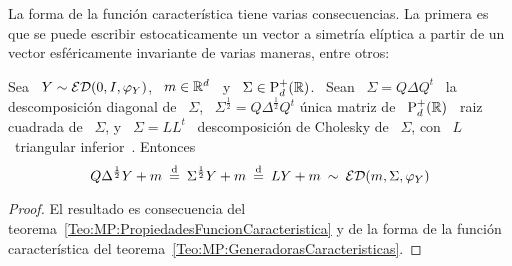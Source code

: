 La forma de la funci\'on caracter\'istica tiene varias consecuencias. La primera
es  que se  puede escribir  estocaticamente un  vector a  simetr\'ia  el\'iptica a
partir de un vector esf\'ericamente invariante de varias maneras, entre otros:
%
\begin{corolario}
  Sea  \ $Y  \sim  \mathcal{ED}(0,I,\varphi_Y)$, \  $m \in  \mathbb{R}^d$  \ y  \ $\Sigma  \in
  \mathrm{P}_d^+(\mathbb{R})$. \ Sean \ $\Sigma = Q \Delta Q^t$ \ la descomposici\'on diagonal
  de \ $\Sigma$, \ $\Sigma^{\frac12} = Q \Delta^{\frac12} Q^t$ \'unica matriz de
  \  $\mathrm{P}_d^+(\mathbb{R})$ \  raiz cuadrada  de \  $\Sigma$,  y \  $\Sigma =  L L^t$  \
  descomposici\'on  de  Cholesky   de  \  $\Sigma$,  con  \   $L$  \  triangular
  inferior~\cite{HorJoh13, Bha07}.  Entonces
  \[
  Q \Delta^{\frac12} Y + m \: \stackrel{\mathrm{d}}{=} \:  \Sigma^{\frac12} Y + m \: \stackrel{\mathrm{d}}{=} \: L Y
  + m \: \sim \: \mathcal{ED}(m,\Sigma,\varphi_Y)
  \]
\end{corolario}
%
\begin{proof}
  El             resultado            es             consecuencia            del
  teorema~\ref{Teo:MP:PropiedadesFuncionCaracteristica}  y  de  la forma  de  la
  funci\'on caracter\'istica del teorema~\ref{Teo:MP:GeneradorasCaracteristicas}.
\end{proof}

